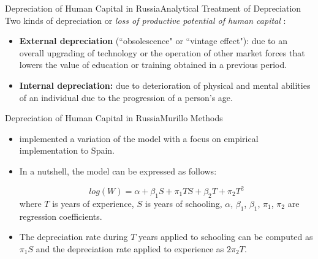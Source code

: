 \documentclass{beamer}
\begin{document}
\begin{frame}{Depreciation of Human Capital in Russia}{Analytical Treatment of Depreciation}
	Two kinds of depreciation or \textit{loss of productive potential of human capital} \citep{neuman_091._1995}:
	\begin{itemize}
		\item \textbf{External depreciation} (``obsolescence" or ``vintage effect"): due to an overall upgrading of technology or the operation of other market forces that lowers the value of education or training obtained in a previous period.
		\item \textbf{Internal depreciation:} due to deterioration of physical and mental abilities of an individual due to the progression of a person's age.
	\end{itemize}
\end{frame}

\begin{frame}{Depreciation of Human Capital in Russia}{Murillo Methods}
\begin{itemize}
	\item \citet{murillo_172._2006} implemented a variation of the \citet{neuman_091._1995} model with a focus on
	empirical implementation to Spain.
	\item In a nutshell, the model can be expressed as follows:
	
	\begin{equation}
	log(W) = \alpha +  \beta_{1}S + \pi_{1}TS + \beta_{2}T + \pi_{2}T^{2} 
	\end{equation}
	where $T$ is years of experience, $S$ is years of schooling, $\alpha$, $\beta_{1}$, $\beta_{1}$, $\pi_{1}$, $\pi_{2}$ are regression coefficients.
	\vspace{2pt}
	\item The depreciation rate during $T$ years applied to schooling can be computed as $\pi_{1}S $ and the depreciation rate applied to experience as $ 2\pi_{2}T$.
\end{itemize}
\end{frame}

\end{document}

